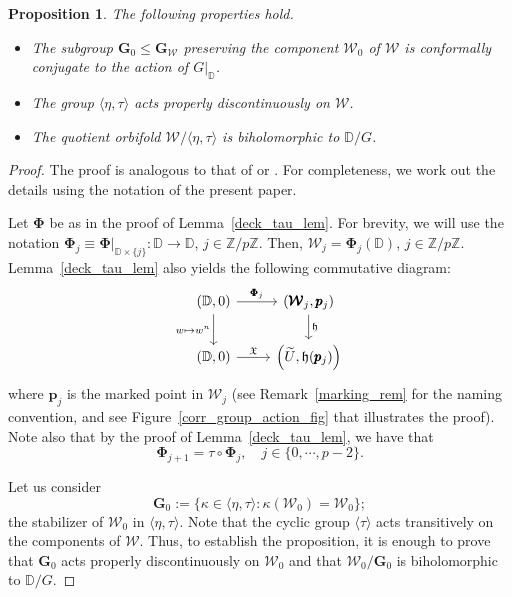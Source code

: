\documentclass[11pt,a4paper, oneside]{amsart}
\newtheorem{prop}[thm]{Proposition}
\theoremstyle{definition}
\theoremstyle{remark}
\numberwithin{equation}{section}
\def\D{{\mathbb{D}}}
\def\Z{{\mathbb{Z}}}
\def\cW{\mathcal {W}}
\renewcommand{\leq}{\leqslant}
\renewcommand{\tilde}{\widetilde}
\begin{document}
\begin{prop}\label{orbifold_isom_prop}
The following properties hold.
\noindent\begin{itemize}[leftmargin=8mm]
    \item The subgroup $\pmb{G}_0\leq\pmb{G}_{\pmb{\cW}}$ preserving the component $\pmb{\cW}_0$ of $\pmb{\cW}$ is conformally conjugate to the action of $G\vert_{\D}$.

    \item The group $\langle\eta, \tau\rangle$ acts properly discontinuously on $\pmb{\cW}$.

    \item The quotient orbifold $\pmb{\cW}/\langle\eta, \tau\rangle$ is biholomorphic to $\mathbb{D}/G$.
\end{itemize}
\end{prop}
\begin{proof}
The proof is analogous to that of \cite[Proposition~5.7]{MM} or \cite[Proposition~6.8]{MV25}. For completeness, we work out the details using the notation of the present paper.

Let $\pmb{\Phi}$ be as in the proof of Lemma~\ref{deck_tau_lem}. For brevity, we will use the notation $\pmb{\Phi}_j\equiv\pmb{\Phi}\vert_{\D\times\{j\}}:\D\to\D$, $j\in\Z/p\Z$. Then, $\pmb{\cW}_j=\pmb{\Phi}_j(\mathbb{D})$, $j\in\Z/p\Z$. 
Lemma~\ref{deck_tau_lem} also yields the following commutative diagram:
\[
 \begin{tikzcd}
\left(\D,0\right)    \arrow{d}[swap]{w\mapsto w^n} \arrow{r}{\pmb{\Phi}_j} &  \left(\pmb{\cW}_j,\pmb{p}_j\right)
\arrow{d}{\mathfrak{h}} \\
\left(\D,0\right)   \arrow{r}{\mathfrak{X}}  & \left(\tilde U,\mathfrak{h}(\pmb{p}_j)\right)
\end{tikzcd}
\]
where $\pmb{p}_j$ is the marked point in $\pmb{\cW}_j$ (see Remark~\ref{marking_rem} for the naming convention, and see Figure~\ref{corr_group_action_fig} that illustrates the proof). Note also that by the proof of Lemma~\ref{deck_tau_lem}, we have that
\begin{equation}
\pmb{\Phi}_{j+1}=\tau\circ\pmb{\Phi}_j,\quad j\in\{0,\cdots,p-2\}.
\label{phi_relation_eqn}
\end{equation}

Let us consider 
$$
\pmb{G}_0:=\{\kappa\in\langle\eta,\tau\rangle: \kappa(\pmb{\cW}_0)=\pmb{\cW}_0\};
$$
the stabilizer of $\pmb{\cW}_0$ in $\langle\eta,\tau\rangle$. Note that the cyclic group $\langle\tau\rangle$ acts transitively on the components of $\pmb{\cW}$. Thus, to establish the proposition, it is enough to prove that $\pmb{G}_0$ acts properly discontinuously on $\pmb{\cW}_0$ and that $\pmb{\cW}_0/\pmb{G}_0$ is biholomorphic to $\D/G$. 



\end{proof}
\end{document}

